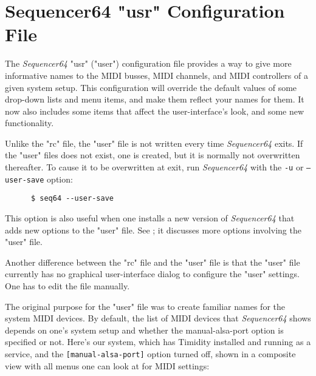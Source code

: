 %
%
%

\section{Sequencer64 "usr" Configuration File}
\label{sec:seq64_usr_file}

   The \textsl{Sequencer64} "usr" ("user")
   configuration file provides a way to give more
   informative names to the MIDI busses, MIDI channels, and MIDI controllers of
   a given system setup.  This configuration will override the default values
   of some drop-down lists and menu items, and make them reflect your names for
   them.  It now also includes some items that affect the user-interface's
   look, and some new functionality.

   Unlike the "rc" file, the "user" file is not written every time
   \textsl{Sequencer64} exits.  If the "user" files does not exist, one is
   created, but it is normally not overwritten thereafter.  To
   cause it to be overwritten at exit, run \textsl{Sequencer64} with the
   \texttt{-u} or \texttt{--user-save} option:

   \begin{verbatim}
      $ seq64 --user-save
   \end{verbatim}

   This option is also useful when one installs a new version of
   \textsl{Sequencer64} that adds new options to the "user" file.
   See ; it discusses more options involving the
   "user" file.

   Another difference between the "rc" file and the "user" file is that
   the "user" file currently has no graphical user-interface dialog to
   configure the "user" settings.  One has to edit the file manually.

   The original purpose for the "user" file was to create familiar names for the
   system MIDI devices.
   By default, the list of MIDI devices that \textsl{Sequencer64} shows depends
   on one's system setup and whether the manual-alsa-port option is specified
   or not.  Here's our system, which has Timidity installed and running as a
   service, and the \texttt{[manual-alsa-port]} option turned off, shown in a
   composite view with all menus one can look at for MIDI settings:

